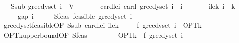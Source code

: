 \begin{isabellebody}
\ \ \ S{\isacharunderscore}{\kern0pt}sub{\isacharcolon}{\kern0pt}\ {\isachardoublequoteopen}greedy{\isacharunderscore}{\kern0pt}set\ i\ {\isasymsubseteq}\ V{\isachardoublequoteclose}\isanewline
\ \ \ \ \ \ \ card{\isacharunderscore}{\kern0pt}le{\isacharunderscore}{\kern0pt}i{\isacharcolon}{\kern0pt}\ {\isachardoublequoteopen}card\ {\isacharparenleft}{\kern0pt}greedy{\isacharunderscore}{\kern0pt}set\ i{\isacharparenright}{\kern0pt}\ {\isasymle}\ i{\isachardoublequoteclose}\isanewline
\ \ \ \ \ \ \ i{\isacharunderscore}{\kern0pt}le{\isacharunderscore}{\kern0pt}k{\isacharcolon}{\kern0pt}\ {\isachardoublequoteopen}i\ {\isasymle}\ k{\isachardoublequoteclose}\isanewline
\ \ \ {\isachardoublequoteopen}{}\ {\isasymle}\ gap\ i{\isachardoublequoteclose}\isanewline
%
\isadelimproof
%
\endisadelimproof
%
\isatagproof
{}\isamarkupfalse%
\ {\isacharminus}{\kern0pt}\isanewline
\ \ \isamarkupfalse%
\ S{\isacharunderscore}{\kern0pt}feas{\isacharcolon}{\kern0pt}\ {\isachardoublequoteopen}feasible\ {\isacharparenleft}{\kern0pt}greedy{\isacharunderscore}{\kern0pt}set\ i{\isacharparenright}{\kern0pt}{\isachardoublequoteclose}\isanewline
\ \ \ \ \isamarkupfalse%
\ greedy{\isacharunderscore}{\kern0pt}set{\isacharunderscore}{\kern0pt}feasible{\isacharbrackleft}{\kern0pt}OF\ S{\isacharunderscore}{\kern0pt}sub\ card{\isacharunderscore}{\kern0pt}le{\isacharunderscore}{\kern0pt}i\ i{\isacharunderscore}{\kern0pt}le{\isacharunderscore}{\kern0pt}k{\isacharbrackright}{\kern0pt}\ \isakeywordONE{{\isachardot}{\kern0pt}}\isamarkupfalse%
\isanewline
\ \ \isamarkupfalse%
\ {\isachardoublequoteopen}f\ {\isacharparenleft}{\kern0pt}greedy{\isacharunderscore}{\kern0pt}set\ i{\isacharparenright}{\kern0pt}\ {\isasymle}\ OPT{\isacharunderscore}{\kern0pt}k{\isachardoublequoteclose}\isanewline
\ \ \ \ \isamarkupfalse%
\ OPT{\isacharunderscore}{\kern0pt}k{\isacharunderscore}{\kern0pt}upper{\isacharunderscore}{\kern0pt}bound{\isacharbrackleft}{\kern0pt}OF\ S{\isacharunderscore}{\kern0pt}feas{\isacharbrackright}{\kern0pt}\ \isakeywordONE{{\isachardot}{\kern0pt}}\isamarkupfalse%
\isanewline
\ \ \isamarkupfalse%
\ \isamarkupfalse%
\ {\isachardoublequoteopen}{}\ {\isasymle}\ OPT{\isacharunderscore}{\kern0pt}k\ {\isacharminus}{\kern0pt}\ f\ {\isacharparenleft}{\kern0pt}greedy{\isacharunderscore}{\kern0pt}set\ i{\isacharparenright}{\kern0pt}{\isachardoublequoteclose}\isanewline

\end{isabellebody}
